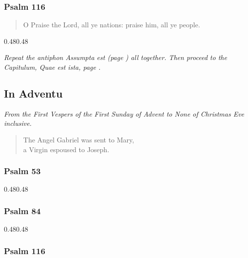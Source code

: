 \documentclass[12pt,a5paper]{memoir}
\newcommand{\rubrics}[1]{\noindent\textit{#1}}
\newcommand{\setupParallel}{\begin{Parallel}{0.48\textwidth}{0.48\textwidth}}
\begin{document}
\subsubsection*{Psalm 116}


\begin{verse}
O Praise the Lord, all ye nations: praise him, all ye people.
\end{verse}

\setupParallel

\end{Parallel}

\bigskip

\rubrics{Repeat the antiphon \emph{Assumpta est} (page \pageref{assumpta}) all together. Then proceed to the Capitulum, \emph{Quae est ista}, page \pageref{primechapteryear}. }


\subsection*{In Adventu}

\rubrics{From the First Vespers of the First Sunday of Advent to None of Christmas Eve inclusive.}


\label{missusest}

\begin{verse}
The Angel Gabriel was sent to Mary,\\
a Virgin espoused to Joseph.
\end{verse}

\subsubsection*{Psalm 53}


\setupParallel

\end{Parallel}

\subsubsection*{Psalm 84}


\setupParallel

\end{Parallel}


\subsubsection*{Psalm 116}
\end{document}
